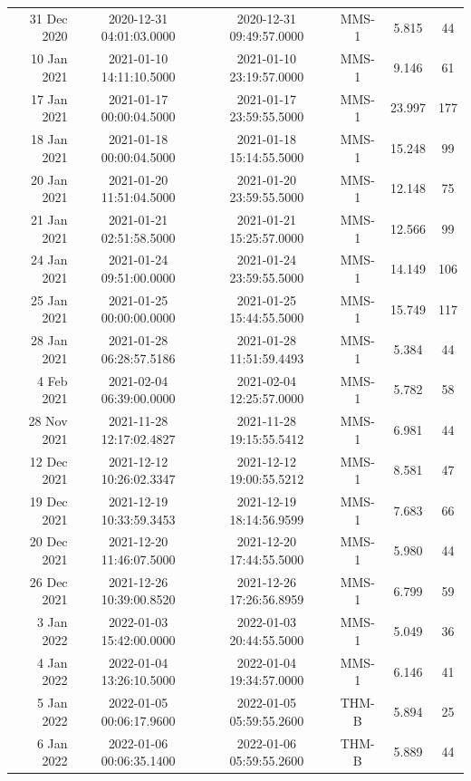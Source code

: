 \begin{longtable}{r|ccccc}
31 Dec 2020    &  2020-12-31 04:01:03.0000 &  2020-12-31 09:49:57.0000 &  MMS-1 &    5.815 &     44 \\
10 Jan 2021    &  2021-01-10 14:11:10.5000 &  2021-01-10 23:19:57.0000 &  MMS-1 &    9.146 &     61 \\
17 Jan 2021    &  2021-01-17 00:00:04.5000 &  2021-01-17 23:59:55.5000 &  MMS-1 &   23.997 &    177 \\
18 Jan 2021    &  2021-01-18 00:00:04.5000 &  2021-01-18 15:14:55.5000 &  MMS-1 &   15.248 &     99 \\
20 Jan 2021    &  2021-01-20 11:51:04.5000 &  2021-01-20 23:59:55.5000 &  MMS-1 &   12.148 &     75 \\
21 Jan 2021    &  2021-01-21 02:51:58.5000 &  2021-01-21 15:25:57.0000 &  MMS-1 &   12.566 &     99 \\
24 Jan 2021    &  2021-01-24 09:51:00.0000 &  2021-01-24 23:59:55.5000 &  MMS-1 &   14.149 &    106 \\
25 Jan 2021    &  2021-01-25 00:00:00.0000 &  2021-01-25 15:44:55.5000 &  MMS-1 &   15.749 &    117 \\
28 Jan 2021    &  2021-01-28 06:28:57.5186 &  2021-01-28 11:51:59.4493 &  MMS-1 &    5.384 &     44 \\
4 Feb 2021     &  2021-02-04 06:39:00.0000 &  2021-02-04 12:25:57.0000 &  MMS-1 &    5.782 &     58 \\
28 Nov 2021    &  2021-11-28 12:17:02.4827 &  2021-11-28 19:15:55.5412 &  MMS-1 &    6.981 &     44 \\
12 Dec 2021    &  2021-12-12 10:26:02.3347 &  2021-12-12 19:00:55.5212 &  MMS-1 &    8.581 &     47 \\
19 Dec 2021    &  2021-12-19 10:33:59.3453 &  2021-12-19 18:14:56.9599 &  MMS-1 &    7.683 &     66 \\
20 Dec 2021    &  2021-12-20 11:46:07.5000 &  2021-12-20 17:44:55.5000 &  MMS-1 &    5.980 &     44 \\
26 Dec 2021    &  2021-12-26 10:39:00.8520 &  2021-12-26 17:26:56.8959 &  MMS-1 &    6.799 &     59 \\
3 Jan 2022     &  2022-01-03 15:42:00.0000 &  2022-01-03 20:44:55.5000 &  MMS-1 &    5.049 &     36 \\
4 Jan 2022     &  2022-01-04 13:26:10.5000 &  2022-01-04 19:34:57.0000 &  MMS-1 &    6.146 &     41 \\
5 Jan 2022     &  2022-01-05 00:06:17.9600 &  2022-01-05 05:59:55.2600 &  THM-B &    5.894 &     25 \\
6 Jan 2022     &  2022-01-06 00:06:35.1400 &  2022-01-06 05:59:55.2600 &  THM-B &    5.889 &     44 \\

\end{longtable}

